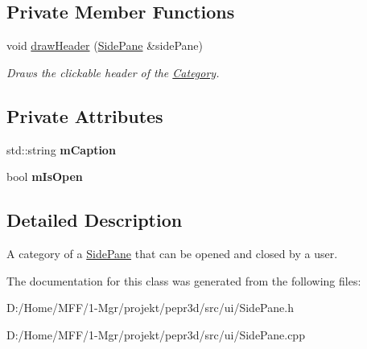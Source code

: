 \subsection*{Private Member Functions}
\begin{DoxyCompactItemize}
\item 
\mbox{\label{classpepr3d_1_1_side_pane_1_1_category_a774041d63e1e1c39dd22f5f221fc6797}} 
void \mbox{\hyperlink{classpepr3d_1_1_side_pane_1_1_category_a774041d63e1e1c39dd22f5f221fc6797}{draw\+Header}} (\mbox{\hyperlink{classpepr3d_1_1_side_pane}{Side\+Pane}} \&side\+Pane)
\begin{DoxyCompactList}\small\item\em Draws the clickable header of the \mbox{\hyperlink{classpepr3d_1_1_side_pane_1_1_category}{Category}}. \end{DoxyCompactList}\end{DoxyCompactItemize}
\subsection*{Private Attributes}
\begin{DoxyCompactItemize}
\item 
\mbox{\label{classpepr3d_1_1_side_pane_1_1_category_a90d6ee307568b7a321fe9b6b57bfe792}} 
std\+::string {\bfseries m\+Caption}
\item 
\mbox{\label{classpepr3d_1_1_side_pane_1_1_category_a5b8bfd770ebb2c4e786f15ada443efa6}} 
bool {\bfseries m\+Is\+Open}
\end{DoxyCompactItemize}


\subsection{Detailed Description}
A category of a \mbox{\hyperlink{classpepr3d_1_1_side_pane}{Side\+Pane}} that can be opened and closed by a user. 

The documentation for this class was generated from the following files\+:\begin{DoxyCompactItemize}
\item 
D\+:/\+Home/\+M\+F\+F/1-\/\+Mgr/projekt/pepr3d/src/ui/Side\+Pane.\+h\item 
D\+:/\+Home/\+M\+F\+F/1-\/\+Mgr/projekt/pepr3d/src/ui/Side\+Pane.\+cpp\end{DoxyCompactItemize}
